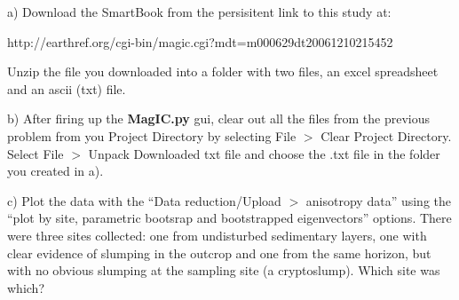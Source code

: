 {a)  Download the  SmartBook from  the persisitent link to this study at:

http://earthref.org/cgi-bin/magic.cgi?mdt=m000629dt20061210215452

Unzip the file you downloaded into a folder with two files, an excel spreadsheet and an ascii (txt) file.

b)   After firing up the {\bf MagIC.py} gui, clear out all the files from the previous problem from you Project Directory by selecting File $>$ Clear Project Directory.      Select File $>$ Unpack Downloaded txt file and choose the .txt file in the folder you created in a).   

c) Plot the data with the ``Data reduction/Upload $>$ anisotropy data'' using the ``plot by site, parametric bootsrap and bootstrapped eigenvectors'' options.  There were three sites collected:  one from  undisturbed sedimentary layers,  one with clear evidence of slumping in the outcrop and one from the same horizon, but with no obvious slumping at the sampling site (a cryptoslump).  Which site was which?  
}
%
